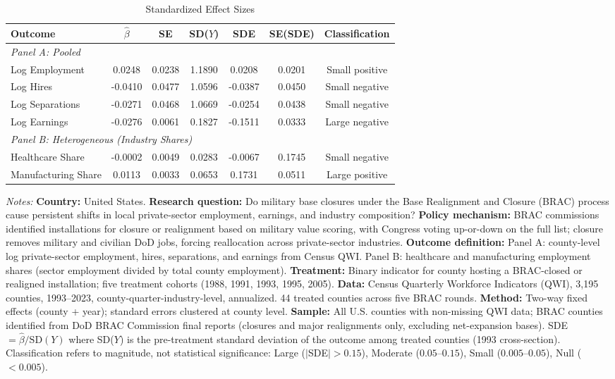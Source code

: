 \begin{table}[!t]
\centering
\caption{Standardized Effect Sizes}
\label{tab:sde}
\small
\begin{tabular}{lcccccc}
\hline\hline
Outcome & $\hat{\beta}$ & SE & SD($Y$) & SDE & SE(SDE) & Classification \\
\hline
\multicolumn{7}{l}{\textit{Panel A: Pooled}} \\
Log Employment & 0.0248 & 0.0238 & 1.1890 & 0.0208 & 0.0201 & Small positive \\
Log Hires & -0.0410 & 0.0477 & 1.0596 & -0.0387 & 0.0450 & Small negative \\
Log Separations & -0.0271 & 0.0468 & 1.0669 & -0.0254 & 0.0438 & Small negative \\
Log Earnings & -0.0276 & 0.0061 & 0.1827 & -0.1511 & 0.0333 & Large negative \\
[6pt]
\multicolumn{7}{l}{\textit{Panel B: Heterogeneous (Industry Shares)}} \\
Healthcare Share & -0.0002 & 0.0049 & 0.0283 & -0.0067 & 0.1745 & Small negative \\
Manufacturing Share & 0.0113 & 0.0033 & 0.0653 & 0.1731 & 0.0511 & Large positive \\
\hline\hline
\end{tabular}
\begin{tablenotes}[flushleft]\small
\item \textit{Notes:} \textbf{Country:} United States. \textbf{Research question:} Do military base closures under the Base Realignment and Closure (BRAC) process cause persistent shifts in local private-sector employment, earnings, and industry composition? \textbf{Policy mechanism:} BRAC commissions identified installations for closure or realignment based on military value scoring, with Congress voting up-or-down on the full list; closure removes military and civilian DoD jobs, forcing reallocation across private-sector industries. \textbf{Outcome definition:} Panel A: county-level log private-sector employment, hires, separations, and earnings from Census QWI. Panel B: healthcare and manufacturing employment shares (sector employment divided by total county employment). \textbf{Treatment:} Binary indicator for county hosting a BRAC-closed or realigned installation; five treatment cohorts (1988, 1991, 1993, 1995, 2005). \textbf{Data:} Census Quarterly Workforce Indicators (QWI), 3,195 counties, 1993--2023, county-quarter-industry-level, annualized. 44 treated counties across five BRAC rounds. \textbf{Method:} Two-way fixed effects (county + year); standard errors clustered at county level. \textbf{Sample:} All U.S. counties with non-missing QWI data; BRAC counties identified from DoD BRAC Commission final reports (closures and major realignments only, excluding net-expansion bases). SDE $= \hat{\beta} / \text{SD}(Y)$ where SD($Y$) is the pre-treatment standard deviation of the outcome among treated counties (1993 cross-section). Classification refers to magnitude, not statistical significance: Large ($|$SDE$| > 0.15$), Moderate ($0.05$--$0.15$), Small ($0.005$--$0.05$), Null ($< 0.005$).
\end{tablenotes}
\end{table}

